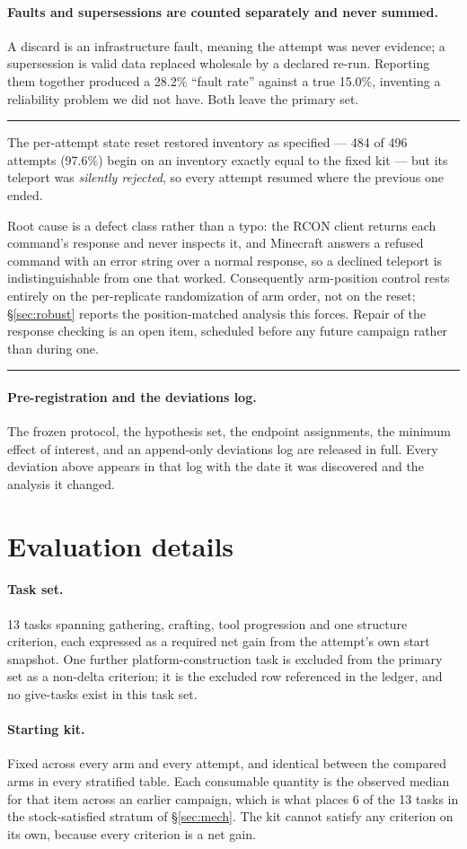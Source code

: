 \documentclass[11pt]{article}
\newcommand{\runin}[1]{\paragraph{#1}}
\newenvironment{callout}[1]
  {\par\medskip\noindent\rule{\linewidth}{0.9pt}\par\nobreak\smallskip
   \noindent{\footnotesize\textsc{#1}}\par\nobreak\smallskip\small}
  {\par\smallskip\noindent\rule{\linewidth}{0.4pt}\par\medskip}
\begin{document}
\runin{Faults and supersessions are counted separately and never summed.}
A discard is an infrastructure fault, meaning the attempt was never
evidence; a supersession is valid data replaced wholesale by a declared
re-run. Reporting them together produced a 28.2\% ``fault rate'' against
a true 15.0\%, inventing a reliability problem we did not have. Both
leave the primary set.

\begin{callout}{Disclosed deviation}
The per-attempt state reset restored inventory as specified --- 484 of
496 attempts (97.6\%) begin on an inventory exactly equal to the fixed
kit --- but its teleport was \emph{silently rejected}, so every attempt
resumed where the previous one ended.

\smallskip
Root cause is a defect class rather than a typo: the RCON client returns
each command's response and never inspects it, and Minecraft answers a
refused command with an error string over a normal response, so a
declined teleport is indistinguishable from one that worked.
Consequently arm-position control rests entirely on the per-replicate
randomization of arm order, not on the reset; \S\ref{sec:robust} reports
the position-matched analysis this forces. Repair of the response
checking is an open item, scheduled before any future campaign rather
than during one.
\end{callout}

\runin{Pre-registration and the deviations log.}
The frozen protocol, the hypothesis set, the endpoint assignments, the
minimum effect of interest, and an append-only deviations log are
released in full. Every deviation above appears in that log with the
date it was discovered and the analysis it changed.

\section{Evaluation details}
\label{app:eval}

\runin{Task set.}
13 tasks spanning gathering, crafting, tool progression and one
structure criterion, each expressed as a required net gain from the
attempt's own start snapshot. One further platform-construction task is
excluded from the primary set as a non-delta criterion; it is the
excluded row referenced in the ledger, and no give-tasks exist in this
task set.

\runin{Starting kit.}
Fixed across every arm and every attempt, and identical between the
compared arms in every stratified table. Each consumable quantity is the
observed median for that item across an earlier campaign, which is what
places 6 of the 13 tasks in the stock-satisfied stratum of
\S\ref{sec:mech}. The kit cannot satisfy any criterion on its own,
because every criterion is a net gain.
\end{document}
